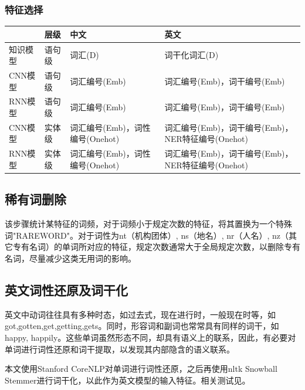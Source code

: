 \subsubsection{特征选择}
\begin{center}
\begin{tabu}to \textwidth{X|X|X[3]|X[3]} 
\hline
& 层级 & 中文 & 英文\\
\hline
知识模型 & 语句级 & 词汇(D) & 词干化词汇(D)\\
\hline
CNN模型 & 语句级 & 词汇编号(Emb) & 词汇编号(Emb)，词干编号(Emb)\\
\hline
RNN模型 & 语句级 & 词汇编号(Emb) & 词汇编号(Emb)，词干编号(Emb)\\
\hline
CNN模型 & 实体级 & 词汇编号(Emb)，词性编号(Onehot) & 词汇编号(Emb)，词干编号(Emb)，NER特征编号(Onehot)\\
\hline
RNN模型 & 实体级 & 词汇编号(Emb)，词性编号(Onehot) & 词汇编号(Emb)，词干编号(Emb)，NER特征编号(Onehot)\\
\hline
\end{tabu}
\end{center}

\subsection{稀有词删除}
该步骤统计某特征的词频，对于词频小于规定次数的特征，将其置换为一个特殊词"RAREWORD"。对于词性为nt（机构团体）, ns（地名）, nr（人名）, nz（其它专有名词）的单词所对应的特征，规定次数通常大于全局规定次数，以删除专有名词，尽量减少这类无用词的影响。

\subsection{英文词性还原及词干化}
英文中动词往往具有多种时态，如过去式，现在进行时，一般现在时等，如got,gotten,get,getting,gets。同时，形容词和副词也常常具有同样的词干，如happy, happily。这些单词虽然形态不同，却具有语义上的联系，因此，有必要对单词进行词性还原和词干提取，以发现其内部隐含的语义联系。\par
本文使用Stanford CoreNLP对单词进行词性还原，之后再使用nltk Snowball Stemmer进行词干化，以此作为英文模型的输入特征。相关测试见。
